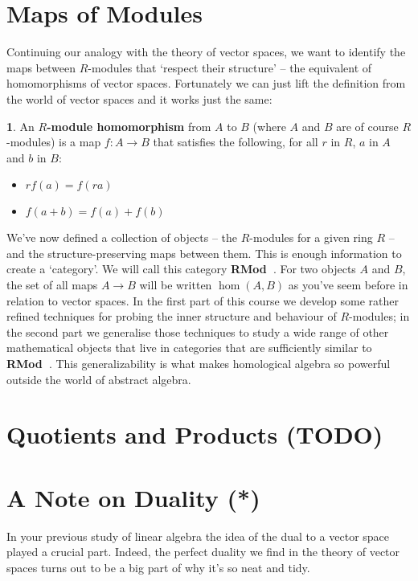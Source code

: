 \documentclass[oneside,english]{amsbook}
\numberwithin{section}{chapter}
\theoremstyle{plain}
\theoremstyle{definition}
\newtheorem{defn}[thm]{\protect\definitionname}
\providecommand{\definitionname}{Definition}
\newcommand{\catname}[1]{{\normalfont\textbf{#1}}}
\newcommand{\RMod}{\catname{RMod\ }}
\begin{document}
	
		\section{Maps of Modules}
			
			Continuing our analogy with the theory of vector spaces, we want to identify the maps between $R$-modules that `respect their structure' -- the equivalent of homomorphisms of vector spaces. Fortunately we can just lift the definition from the world of vector spaces and it works just the same:
			
			\begin{defn}
				An \textbf{$R$-module homomorphism} from $A$ to $B$ (where $A$ and $B$ are of course $R$-modules) is a map $f:A\to B$ that satisfies the following, for all $r$ in $R$, $a$ in $A$ and $b$ in $B$:
				\begin{itemize}
					\item $rf(a) = f(ra)$
					\item $f(a + b) = f(a) + f(b)$
				\end{itemize}
			\end{defn}
			
			We've now defined a collection of objects -- the $R$-modules for a given ring $R$ -- and the structure-preserving maps between them. This is enough information to create a `category'. We will call this category \RMod. For two objects $A$ and $B$, the set of all maps $A\to B$ will be written $\hom(A, B)$ as you've seem before in relation to vector spaces. In the first part of this course we develop some rather refined techniques for probing the inner structure and behaviour of $R$-modules; in the second part we generalise those techniques to study a wide range of other mathematical objects that live in categories that are sufficiently similar to \RMod. This generalizability is what makes homological algebra so powerful outside the world of abstract algebra.
		
		\section{Quotients and Products (TODO)}
	
		\section{A Note on Duality (*)}
	
			In your previous study of linear algebra the idea of the dual to a vector space played a crucial part. Indeed, the perfect duality we find in the theory of vector spaces turns out to be a big part of why it's so neat and tidy.
			
\end{document}
